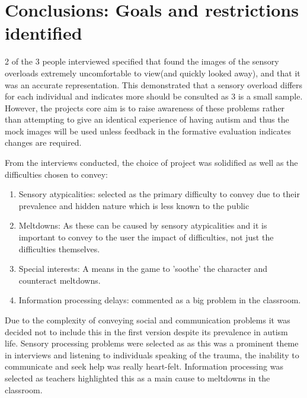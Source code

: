 \section{Conclusions: Goals and restrictions identified}

2 of the 3 people interviewed specified that found the images of the sensory overloads extremely uncomfortable to view(and quickly looked away), and that it was an accurate representation. This demonstrated that a sensory overload differs for each individual and indicates more should be consulted as 3 is a small sample. However, the projects core aim is to raise awareness of these problems rather than attempting to give an identical experience of having autism and thus the mock images will be used unless feedback in the formative evaluation indicates changes are required. 

From the interviews conducted, the choice of project was solidified as well as the difficulties chosen to convey:

\begin{enumerate}
\item Sensory atypicalities: selected as the primary difficulty to convey due to their prevalence and hidden nature which is less known to the public
\item Meltdowns: As these can be caused by sensory atypicalities and it is important to convey to the user the impact of difficulties, not just the difficulties themselves.
\item Special interests: A means in the game to 'soothe' the character and counteract meltdowns.
\item Information processing delays: commented as a big problem in the classroom.
\end{enumerate}

Due to the complexity of conveying social and communication problems it was decided not to include this in the first version despite its prevalence in autism life. Sensory processing problems were selected as as this was a prominent theme in interviews and listening to individuals speaking of the trauma, the inability to communicate and seek help was really heart-felt. Information processing was selected as teachers highlighted this as a main cause to meltdowns in the classroom. 
